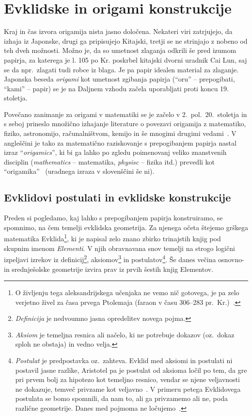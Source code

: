 \section{Evklidske in origami konstrukcije}

Kraj in čas izvora origamija nista jasno določena. Nekateri viri zatrjujejo, da izhaja iz Japonske, drugi ga pripisujejo Kitajski, tretji se ne strinjajo z nobeno od teh dveh možnosti. Možno je, da so umetnost zlaganja odkrili še pred izumom papirja, za katerega je l. 105 po Kr. poskrbel kitajski dvorni uradnik Cai Lun, saj se da npr.\ zlagati tudi robce iz blaga. Je pa papir idealen material za zlaganje. Japonska beseda \emph{origami} kot umetnost zgibanja papirja (``oru'' -- prepogibati, ``kami'' -- papir) se je na Daljnem vzhodu začela uporabljati proti koncu 19. stoletja.

Povečano zanimanje za origami v matematiki se je začelo v 2.\ pol.\ 20.\ stoletja in s seboj prineslo množično izhajanje literature o povezavi origamija z matematiko, fiziko, astronomijo, računalništvom, kemijo in še mnogimi drugimi vedami~\cite{zore2022}. V angleščini je tako za matematično raziskovanje s prepogibanjem papirja nastal izraz ``\emph{origamics}'', ki bi ga lahko po zgledu poimenovanj veliko znanstvenih disciplin (\emph{mathematics} -- matematika, \emph{physisc} -- fizika itd.) prevedli kot ``origamika''~\cite{sgv2016} (uradnega izraza v slovenščini še ni).

\subsection{Evklidovi postulati in evklidske konstrukcije}

Preden si pogledamo, kaj lahko s prepogibanjem papirja konstruiramo, se spomnimo, na čem temelji evklidska geometrija. Za njenega očeta štejemo grškega matematika Evklida\footnote{O življenju tega aleksandrijskega učenjaka ne vemo nič gotovega, je pa zelo verjetno živel za časa prvega Ptolemaja (faraon v času 306--283 pr.\ Kr.)~\cite[str.\ 61]{struik1986}.}, ki je napisal zelo znano zbirko trinajstih knjig pod skupnim imenom \emph{Elementi}. V njih obravnavana snov temelji na strogo logični izpeljavi izrekov iz definicij\footnote{\emph{Definicija} je nedvoumno jasna opredelitev novega pojma.}, aksiomov\footnote{\emph{Aksiom} je temeljna resnica ali načelo, ki ne potrebuje dokazov (oz.\ dokaz sploh ne obstaja) in vedno velja.} in postulatov\footnote{\emph{Postulat} je predpostavka oz.\ zahteva. Evklid med aksiomi in postulati ni postavil jasne razlike, Aristotel pa je postulat od aksioma ločil po tem, da gre pri prvem bolj za hipotezo kot temeljno resnico, vendar se njene veljavnosti ne dokazuje, temveč privzame kot veljavno~\cite[str.\ 122]{euclidI}. V primeru petega Evklidovega postulata se bomo spomnili, da nam to, ali ga privzamemo ali ne, poda različne geometrije. Danes med pojmoma ne ločujemo~\cite[str.\ 2]{geometricconstructions}.}. Še danes večina osnovno- in srednješolske geometrije izvira prav iz prvih šestih knjig Elementov.

